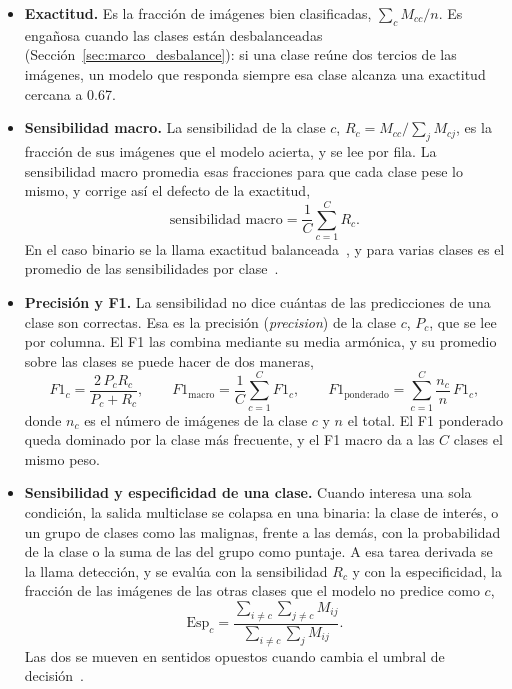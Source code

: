 \begin{itemize}
    \item \textbf{Exactitud.} Es la fracción de imágenes bien clasificadas, $\sum_c M_{cc} / n$. Es engañosa
    cuando las clases están desbalanceadas (Sección~\ref{sec:marco_desbalance}): si una clase reúne dos tercios
    de las imágenes, un modelo que responda siempre esa clase alcanza una exactitud cercana a 0.67.

    \item \textbf{Sensibilidad macro.} La sensibilidad de la clase $c$, $R_c = M_{cc} / \sum_{j} M_{cj}$, es la
    fracción de sus imágenes que el modelo acierta, y se lee por fila. La sensibilidad macro promedia esas
    fracciones para que cada clase pese lo mismo, y corrige así el defecto de la exactitud,
    \begin{equation}
        \text{sensibilidad macro} = \frac{1}{C}\sum_{c=1}^{C} R_c.
        \label{eq:marco_acc_bal}
    \end{equation}
    En el caso binario se la llama exactitud balanceada~\cite{brodersen2010balanced}, y para varias clases es el
    promedio de las sensibilidades por clase~\cite{sokolova2009systematic}.

    \item \textbf{Precisión y F1.} La sensibilidad no dice cuántas de las predicciones de una clase son
    correctas. Esa es la precisión (\emph{precision}) de la clase $c$, $P_c$, que se lee por columna. El F1 las
    combina mediante su media armónica, y su promedio sobre las clases se puede hacer de dos maneras,
    \begin{equation}
        F1_c = \frac{2\,P_c R_c}{P_c + R_c}, \qquad
        F1_{\text{macro}} = \frac{1}{C}\sum_{c=1}^{C} F1_c, \qquad
        F1_{\text{ponderado}} = \sum_{c=1}^{C} \frac{n_c}{n}\, F1_c,
        \label{eq:marco_f1}
    \end{equation}
    donde $n_c$ es el número de imágenes de la clase $c$ y $n$ el total. El F1 ponderado queda dominado por la
    clase más frecuente, y el F1 macro da a las $C$ clases el mismo peso.

    \item \textbf{Sensibilidad y especificidad de una clase.} Cuando interesa una sola condición, la salida
    multiclase se colapsa en una binaria: la clase de interés, o un grupo de clases como las malignas, frente a
    las demás, con la probabilidad de la clase o la suma de las del grupo como puntaje. A esa tarea derivada se
    la llama detección, y se evalúa con la sensibilidad $R_c$ y con la especificidad, la fracción de las imágenes
    de las otras clases que el modelo no predice como $c$,
    \begin{equation}
        \mathrm{Esp}_c = \frac{\sum_{i \neq c}\sum_{j \neq c} M_{ij}}{\sum_{i \neq c}\sum_{j} M_{ij}}.
        \label{eq:marco_sens_esp}
    \end{equation}
    Las dos se mueven en sentidos opuestos cuando cambia el umbral de decisión~\cite{fawcett2006introduction}.


\end{itemize}
